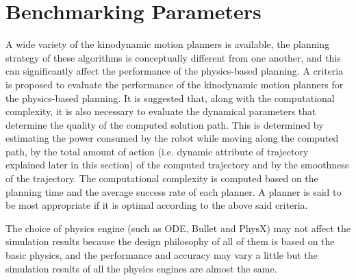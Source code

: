 \documentclass[runningheads,a4paper]{llncs}
\begin{document}
\section{Benchmarking Parameters}\label{s-benchmarking}
A wide variety of the kinodynamic motion  planners is available, the planning strategy of these algorithms is conceptually different
from one another, and this can significantly affect the performance of the physics-based planning. A criteria is proposed to evaluate the performance of the
kinodynamic motion planners
for the physics-based planning. It is suggested that, along with the computational complexity, it is also necessary to evaluate the dynamical parameters
that determine the quality of
the computed solution path. This is determined by estimating the power consumed by the robot while moving along the computed path, by the
total amount of action (i.e. dynamic attribute of trajectory explained later in this section) of the computed trajectory and by the smoothness of the trajectory. The computational complexity is 
computed based on the
planning time and the average success rate of each planner. A planner is said to be most appropriate if it is optimal according to the above said criteria.

The choice of physics engine (such as ODE, Bullet and PhysX) may not affect the simulation results because the
design philosophy of all of them is based on the basic physics, and the performance and accuracy may vary a little but the simulation results of all the physics engines are  almost the same.
\end{document}

